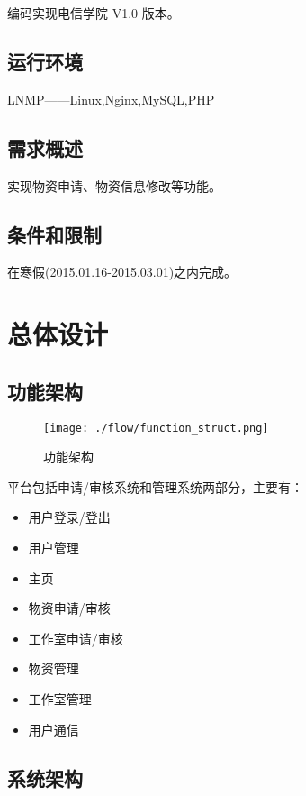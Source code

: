 \documentclass[a4paper,fancyhdr,fntef,hyperref]{ctexart}
\makeatletter
\def\maxwidth{\ifdim\Gin@nat@width>\linewidth\linewidth
\else\Gin@nat@width\fi}
\let\Oldincludegraphics\includegraphics
\renewcommand{\includegraphics}[1]{\Oldincludegraphics[width=\maxwidth]{#1}}
\makeatother
\begin{document}
编码实现电信学院 V1.0 版本。

\subsection{运行环境}\label{ux8fd0ux884cux73afux5883}

LNMP------Linux,Nginx,MySQL,PHP

\subsection{需求概述}\label{ux9700ux6c42ux6982ux8ff0}

实现物资申请、物资信息修改等功能。

\subsection{条件和限制}\label{ux6761ux4ef6ux548cux9650ux5236}

在寒假(2015.01.16-2015.03.01)之内完成。

\section{总体设计}\label{ux603bux4f53ux8bbeux8ba1}

\subsection{功能架构}\label{ux529fux80fdux67b6ux6784}

\begin{figure}[htbp]
\centering
\texttt{[image: ./flow/function\_struct.png]}
\caption{功能架构}
\end{figure}

平台包括申请/审核系统和管理系统两部分，主要有：

\begin{itemize}
\itemsep1pt\parskip0pt
\item
  用户登录/登出
\item
  用户管理
\item
  主页
\item
  物资申请/审核
\item
  工作室申请/审核
\item
  物资管理
\item
  工作室管理
\item
  用户通信
\end{itemize}

\subsection{系统架构}\label{ux7cfbux7edfux67b6ux6784}
\end{document}
